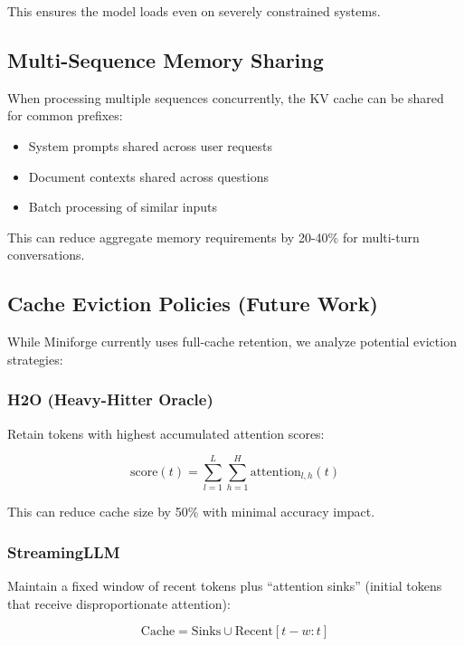 This ensures the model loads even on severely constrained systems.

\subsection{Multi-Sequence Memory Sharing}

When processing multiple sequences concurrently, the KV cache can be shared for common prefixes:

\begin{itemize}
    \item System prompts shared across user requests
    \item Document contexts shared across questions
    \item Batch processing of similar inputs
\end{itemize}

This can reduce aggregate memory requirements by 20-40\% for multi-turn conversations.

\subsection{Cache Eviction Policies (Future Work)}

While Miniforge currently uses full-cache retention, we analyze potential eviction strategies:

\subsubsection{H2O (Heavy-Hitter Oracle)}

Retain tokens with highest accumulated attention scores:

\begin{equation}
\text{score}(t) = \sum_{l=1}^{L} \sum_{h=1}^{H} \text{attention}_{l,h}(t)
\end{equation}

This can reduce cache size by 50\% with minimal accuracy impact.

\subsubsection{StreamingLLM}

Maintain a fixed window of recent tokens plus ``attention sinks'' (initial tokens that receive disproportionate attention):

\begin{equation}
\text{Cache} = \text{Sinks} \cup \text{Recent}[t - w:t]
\end{equation}

